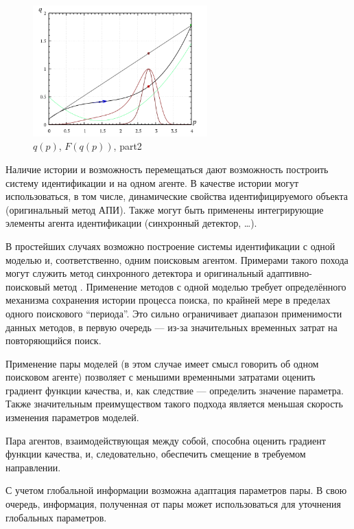 \begin{figure}[htb!]
  \centerline{\includegraphics[width=0.6\textwidth]{pq_2x8.png} }
  \caption{$q(p)$, $F(q(p))$, part2 }
  \label{atu:pq_2x8}
\end{figure}



Наличие истории и возможность перемещаться дают возможность
построить систему идентификации и на одном агенте.
В качестве истории могут использоваться, в том числе,
динамические свойства идентифицируемого объекта
(оригинальный метод АПИ). Также могут быть
применены интегрирующие элементы агента идентификации
(синхронный детектор, \ldots).

В простейших случаях возможно построение системы идентификации
с одной моделью и, соответственно, одним поисковым агентом.
Примерами такого похода могут служить
метод синхронного детектора \cite{adopt_cont_sys}
и оригинальный адаптивно-поисковый метод \cite{mich_92}.
Применение методов с одной моделью требует определённого механизма
сохранения истории процесса поиска, по крайней мере в пределах
одного поискового ``периода''. Это сильно ограничивает диапазон
применимости данных методов, в первую очередь --- из-за значительных
временных затрат на повторяющийся поиск.

Применение пары моделей \cite{atu_asau3} 
(в этом случае имеет смысл говорить об одном поисковом агенте)
позволяет с меньшими временными затратами оценить градиент функции качества,
и, как следствие --- определить значение параметра. Также значительным преимуществом
такого подхода является меньшая скорость изменения параметров моделей.


Пара агентов, взаимодействующая между собой,
способна оценить градиент функции качества,
и, следовательно, обеспечить смещение в требуемом направлении.

С учетом глобальной информации возможна адаптация параметров пары.
В свою очередь, информация, полученная от пары может
использоваться для уточнения глобальных параметров.



